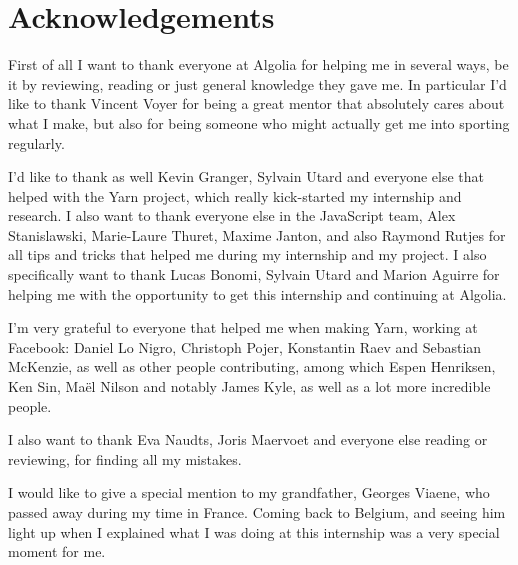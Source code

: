 
\chapter{Acknowledgements}%
\label{chp:acknowledgements}

First of all I want to thank everyone at Algolia for helping me in several ways, be it by reviewing, reading or just general knowledge they gave me. In particular I'd like to thank Vincent Voyer for being a great mentor that absolutely cares about what I make, but also for being someone who might actually get me into sporting regularly.

I'd like to thank as well Kevin Granger, Sylvain Utard and everyone else that helped with the Yarn project, which really kick-started my internship and research. I also want to thank everyone else in the JavaScript team, Alex Stanislawski, Marie-Laure Thuret, Maxime Janton, and also Raymond Rutjes for all tips and tricks that helped me during my internship and my project. I also specifically want to thank Lucas Bonomi, Sylvain Utard and Marion Aguirre for helping me with the opportunity to get this internship and continuing at Algolia.

I'm very grateful to everyone that helped me when making Yarn, working at Facebook: Daniel Lo Nigro, Christoph Pojer, Konstantin Raev and Sebastian McKenzie, as well as other people contributing, among which Espen Henriksen, Ken Sin, Maël Nilson and notably James Kyle, as well as a lot more incredible people.

I also want to thank Eva Naudts, Joris Maervoet and everyone else reading or reviewing, for finding all my mistakes.

I would like to give a special mention to my grandfather, Georges Viaene, who passed away during my time in France. Coming back to Belgium, and seeing him light up when I explained what I was doing at this internship was a very special moment for me. 
